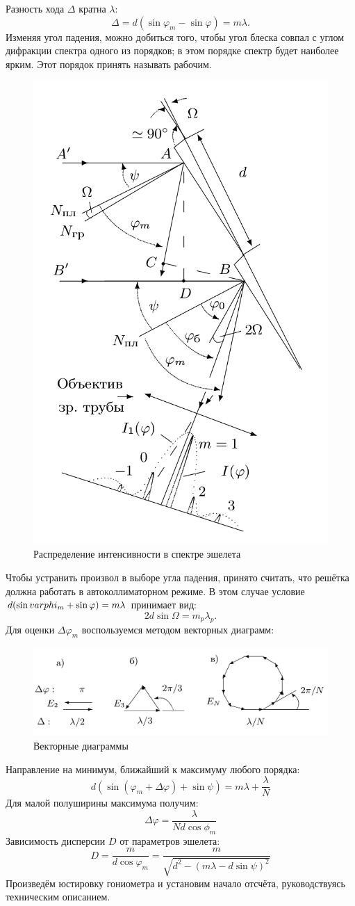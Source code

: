 \documentclass[10pt, a4paper]{article}
\begin{document}
Разность хода $\Delta$ кратна $\lambda$:
\[
\Delta = d (\sin \varphi_m - \sin \varphi) = m \lambda.
\]
Изменяя угол падения, можно добиться того, чтобы угол блеска совпал с углом дифракции спектра одного из порядков; в этом порядке спектр будет наиболее ярким. Этот порядок принять называть рабочим.
\begin{figure}[H]
	\includegraphics[width = 0.5\linewidth]{3.png}
	\caption*{Распределение интенсивности в спектре эшелета}
\end{figure}

Чтобы устранить произвол в выборе угла падения, принято считать, что решётка должна работать в автоколлиматорном режиме. В этом случае условие $d(\sin \\varphi_m + \sin \varphi) = m \lambda$ принимает вид:
\[
	2d \sin \Omega = m_p \lambda_p.
\]
Для оценки $\Delta \varphi_m$ воспользуемся методом векторных диаграмм:
\begin{figure}[H]
	\includegraphics[width = 1.0\linewidth]{2.png}
	\caption*{Векторные диаграммы}
\end{figure}
Направление на минимум, ближайший к максимуму любого порядка:
\[
d(\sin(\varphi_m + \Delta \varphi) + \sin \psi) = m \lambda + \frac{\lambda}{N}
\]
Для малой полуширины максимума получим:
\[
\Delta \varphi = \frac{\lambda}{Nd\cos \phi_m}
\]
Зависимость дисперсии $D$ от параметров эшелета:
\[
D = \frac{m}{d \cos \varphi_m} = \frac{m}{\sqrt{d^2 - (m \lambda - d \sin \psi)^2}}
\]
Произведём юстировку гониометра и установим начало отсчёта, руководствуясь техническим описанием.
\end{document}
